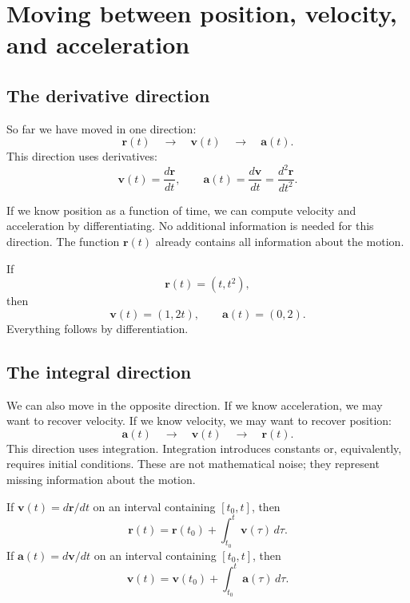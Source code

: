 \section{Moving between position, velocity, and acceleration}

\subsection{The derivative direction}

So far we have moved in one direction:
\[
\mathbf{r}(t)
\quad \longrightarrow \quad
\mathbf{v}(t)
\quad \longrightarrow \quad
\mathbf{a}(t).
\]
This direction uses derivatives:
\[
\mathbf{v}(t)=\frac{d\mathbf{r}}{dt},
\qquad
\mathbf{a}(t)=\frac{d\mathbf{v}}{dt}=\frac{d^2\mathbf{r}}{dt^2}.
\]

If we know position as a function of time, we can compute velocity and acceleration by differentiating. No additional information is needed for this direction. The function \(\mathbf{r}(t)\) already contains all information about the motion.

\begin{examplebox}
If
\[
\mathbf{r}(t)=(t,t^2),
\]
then
\[
\mathbf{v}(t)=(1,2t),
\qquad
\mathbf{a}(t)=(0,2).
\]
Everything follows by differentiation.
\end{examplebox}

\subsection{The integral direction}

We can also move in the opposite direction. If we know acceleration, we may want to recover velocity. If we know velocity, we may want to recover position:
\[
\mathbf{a}(t)
\quad \longrightarrow \quad
\mathbf{v}(t)
\quad \longrightarrow \quad
\mathbf{r}(t).
\]
This direction uses integration. Integration introduces constants or, equivalently, requires initial conditions. These are not mathematical noise; they represent missing information about the motion.

\begin{theorembox}
If \(\mathbf{v}(t)=d\mathbf{r}/dt\) on an interval containing \([t_0,t]\), then
\[
\mathbf{r}(t)=\mathbf{r}(t_0)+\int_{t_0}^{t}\mathbf{v}(\tau)\,d\tau.
\]
If \(\mathbf{a}(t)=d\mathbf{v}/dt\) on an interval containing \([t_0,t]\), then
\[
\mathbf{v}(t)=\mathbf{v}(t_0)+\int_{t_0}^{t}\mathbf{a}(\tau)\,d\tau.
\]
\end{theorembox}

